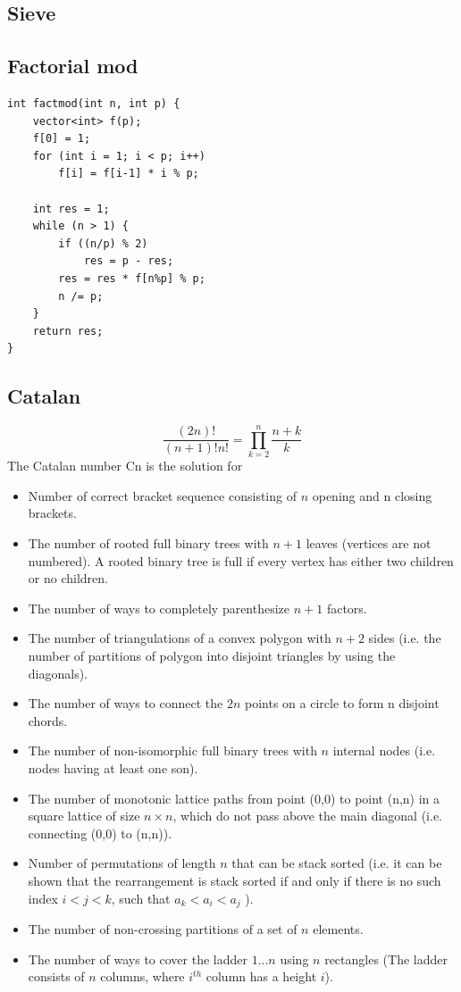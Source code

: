 \documentclass[A4 paper, 12pt, oneside, landscape]{article}
\begin{document}
\begin{multicols}{2}
	\subsection{Sieve}
	

    \subsection{Factorial mod}
    \begin{lstlisting}
int factmod(int n, int p) {
    vector<int> f(p);
    f[0] = 1;
    for (int i = 1; i < p; i++)
        f[i] = f[i-1] * i % p;

    int res = 1;
    while (n > 1) {
        if ((n/p) % 2)
            res = p - res;
        res = res * f[n%p] % p;
        n /= p;
    }
    return res; 
}
    \end{lstlisting}

	\subsection{Catalan}
	\[\frac{(2n)!}{(n + 1)!n!} = \prod_{k = 2}^n \frac{n + k}{k} \]
	The Catalan number Cn is the solution for
	\begin{itemize}
	    \item Number of correct bracket sequence consisting of $n$ opening and n closing brackets.
	    \item The number of rooted full binary trees with $n+1$ leaves (vertices are not numbered). A rooted binary tree is full if every vertex has either two children or no children.
	    \item The number of ways to completely parenthesize $n+1$ factors.
	    \item The number of triangulations of a convex polygon with $n+2$ sides (i.e. the number of partitions of polygon into disjoint triangles by using the diagonals).
	    \item The number of ways to connect the $2n$ points on a circle to form n disjoint chords.
	    \item The number of non-isomorphic full binary trees with $n$ internal nodes (i.e. nodes having at least one son).
	    \item The number of monotonic lattice paths from point (0,0) to point (n,n) in a square lattice of size $n \times n$, which do not pass above the main diagonal (i.e. connecting (0,0) to (n,n)).
	    \item Number of permutations of length $n$ that can be stack sorted (i.e. it can be shown that the rearrangement is stack sorted if and only if there is no such index $i<j<k$, such that $a_k<a_i<a_j$ ).
	    \item The number of non-crossing partitions of a set of $n$ elements.
        \item The number of ways to cover the ladder $1...n$ using $n$ rectangles (The ladder consists of $n$ columns, where $i^{th}$ column has a height $i$).
	\end{itemize}


\end{multicols}
\end{document}

